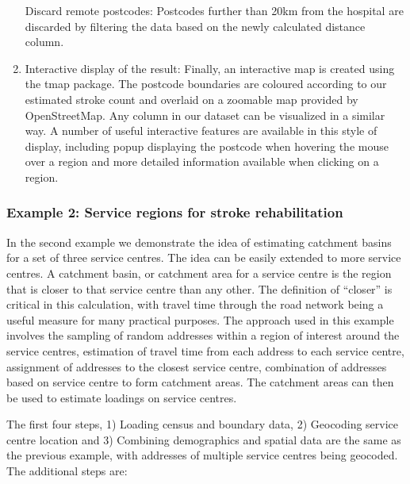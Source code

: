 \documentclass[]{article}
\begin{document}
\begin{enumerate}
  Discard remote postcodes: Postcodes further than 20km from the
  hospital are discarded by filtering the data based on the newly
  calculated distance column.
\item
  Interactive display of the result: Finally, an interactive map is
  created using the tmap package. The postcode boundaries are coloured
  according to our estimated stroke count and overlaid on a zoomable map
  provided by OpenStreetMap. Any column in our dataset can be visualized
  in a similar way. A number of useful interactive features are
  available in this style of display, including popup displaying the
  postcode when hovering the mouse over a region and more detailed
  information available when clicking on a region.
\end{enumerate}

\hypertarget{example-2-service-regions-for-stroke-rehabilitation}{%
\subsubsection{Example 2: Service regions for stroke
rehabilitation}\label{example-2-service-regions-for-stroke-rehabilitation}}

In the second example we demonstrate the idea of estimating catchment
basins for a set of three service centres. The idea can be easily
extended to more service centres. A catchment basin, or catchment area
for a service centre is the region that is closer to that service centre
than any other. The definition of ``closer'' is critical in this
calculation, with travel time through the road network being a useful
measure for many practical purposes. The approach used in this example
involves the sampling of random addresses within a region of interest
around the service centres, estimation of travel time from each address
to each service centre, assignment of addresses to the closest service
centre, combination of addresses based on service centre to form
catchment areas. The catchment areas can then be used to estimate
loadings on service centres.

The first four steps, 1) Loading census and boundary data, 2) Geocoding
service centre location and 3) Combining demographics and spatial data
are the same as the previous example, with addresses of multiple service
centres being geocoded. The additional steps are:
\end{document}
